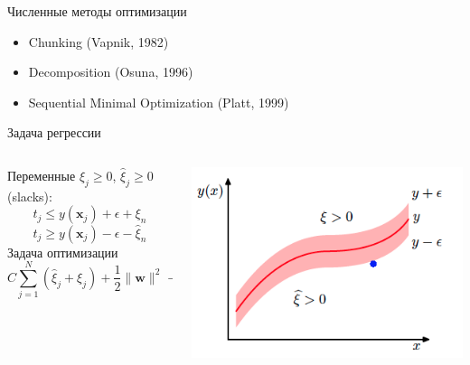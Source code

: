 \documentclass[10pt,a4paper]{beamer}
\begin{document}

\begin{frame}{Численные методы оптимизации}

\begin{itemize}
\item Chunking (Vapnik, 1982)
\item Decomposition (Osuna, 1996)
\item Sequential Minimal Optimization (Platt, 1999)
\end{itemize}

\end{frame}


\begin{frame}{Задача регрессии}

\begin{columns}[T]
    \begin{column}{.51\textwidth}
    
    Переменные $\xi_j \geq 0$, $\hat \xi_j \geq 0$ (slacks):
    \[
    t_j \leq y(\mathbf{x}_j) + \epsilon + \xi_n
    \]
     \[
    t_j \geq y(\mathbf{x}_j) - \epsilon - \hat \xi_n
    \]
    Задача оптимизации
    \[
    C \sum_{j=1}^N (\hat \xi_j + \xi_j) + \frac{1}{2}\|\mathbf{w}\|^2 \rightarrow \min_{\mathbf{w}, b}
    \]    
	
    \end{column}
       
    \begin{column}{.5\textwidth}
    	\vspace{0em}
		\begin{center}
   			\includegraphics[scale=0.45]{images/regression.png}
    	\end{center}
	\end{column}
\end{columns}

\end{frame}
\end{document}
